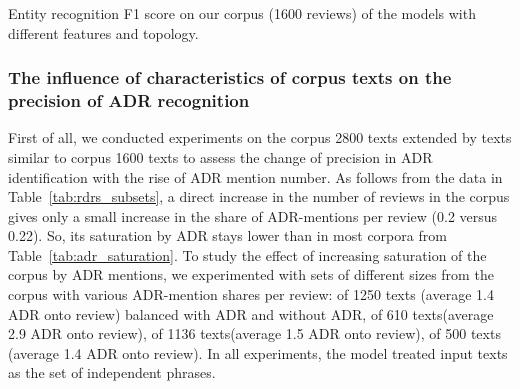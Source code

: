 \documentclass[a4paper,fleqn,longmktitle]{cas-dc}
\begin{document}


\begin{table*}
\centering
\caption{Entity recognition F1 score on our corpus (1600 reviews) of the models with different features and topology.}
\label{tab:feat_top_exp}

\end{table*}

 \subsubsection{The influence of  characteristics of corpus texts on the precision of ADR recognition} %
 First of all, we conducted experiments on the corpus 2800 texts extended by texts similar to corpus 1600 texts to assess the change of precision in ADR identification with the rise of ADR mention number. As follows from the data in Table~\ref{tab:rdrs_subsets}, a direct increase in the number of reviews in the corpus gives only a small increase in the share of ADR-mentions per review (0.2 versus 0.22). So, its saturation by ADR stays lower than in most corpora from Table~\ref{tab:adr_saturation}. To study the effect of increasing saturation of the corpus by ADR mentions, we experimented with  sets of different sizes from the corpus with various ADR-mention shares per review:   of 1250 texts (average 1.4 ADR onto review) balanced with ADR and without ADR, of 610 texts(average 2.9 ADR onto review), of 1136 texts(average 1.5 ADR onto review), of 500 texts (average 1.4 ADR onto review). In all experiments, the model treated input texts as the set of independent phrases.  
\end{document}
